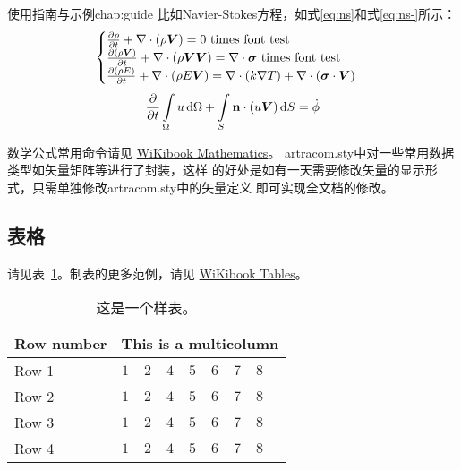\begin{cuzchapter}{使用指南与示例}{chap:guide}
    比如Navier-Stokes方程，如式\eqref{eq:ns}和式\eqref{eq:ns-}所示：
    \begin{equation}
        \label{eq:ns}
        \begin{cases}
            \frac{\partial \rho}{\partial t} + \nabla\cdot(\rho\Vector{V}) = 0 \ \mathrm{times\ font\ test}                                            \\
            \frac{\partial (\rho\Vector{V})}{\partial t} + \nabla\cdot(\rho\Vector{V}\Vector{V}) = \nabla\cdot\Tensor{\sigma} \ \text{times font test} \\
            \frac{\partial (\rho E)}{\partial t} + \nabla\cdot(\rho E\Vector{V}) = \nabla\cdot(k\nabla T) + \nabla\cdot(\Tensor{\sigma}\cdot\Vector{V})
        \end{cases}
    \end{equation}
    \begin{equation}
        \label{eq:ns-}
        \frac{\partial }{\partial t}\int\limits_{\Omega} u \, \mathrm{d}\Omega + \int\limits_{S} \boldsymbol{\mathbf{n}}\cdot(u\boldsymbol{V}) \, \mathrm{d}S = \dot{\phi}
    \end{equation}

    数学公式常用命令请见
    \href{https://en.wikibooks.org/wiki/LaTeX/Mathematics}{WiKibook
        Mathematics}。 artracom.sty中对一些常用数据类型如矢量矩阵等进行了封装，这样
    的好处是如有一天需要修改矢量的显示形式，只需单独修改artracom.sty中的矢量定义
    即可实现全文档的修改。

    \subsection{表格}\label{sub:tables}

    请见表~\ref{tab:sample}。制表的更多范例，请见
    \href{https://en.wikibooks.org/wiki/LaTeX/Tables}{WiKibook Tables}。
    \begin{table}[!htbp]
        \caption[样表]{这是一个样表。}
        \label{tab:sample}
        \centering
        \footnotesize%
        \setlength{\tabcolsep}{4pt}%
        \renewcommand{\arraystretch}{1.2}%
        \begin{tabular}{lcccccccc}
            \hline
            Row number & \multicolumn{8}{c}{This is a multicolumn}                                     \\
            \hline
            Row 1      & $1$                                       & $2$ & $4$ & $5$ & $6$ & $7$ & $8$ \\
            Row 2      & $1$                                       & $2$ & $4$ & $5$ & $6$ & $7$ & $8$ \\
            Row 3      & $1$                                       & $2$ & $4$ & $5$ & $6$ & $7$ & $8$ \\
            Row 4      & $1$                                       & $2$ & $4$ & $5$ & $6$ & $7$ & $8$ \\
            \hline
        \end{tabular}
    \end{table}


\end{cuzchapter}

